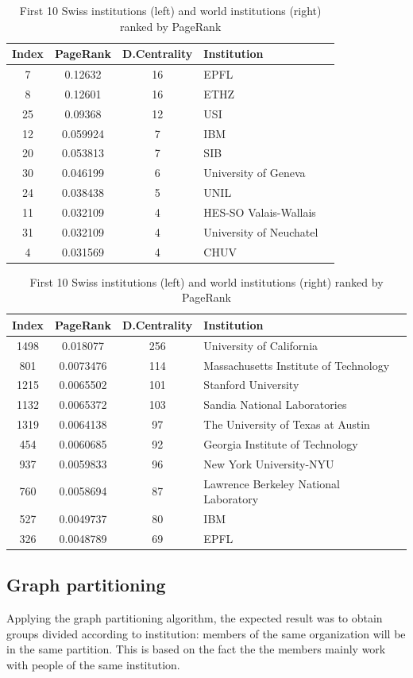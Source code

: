 \documentclass[]{usiinfbachelorproject}
\begin{document}
\newcommand\ddd{\centering}
\begin{table}[tbh]
\centering
\tiny
\caption{First 10 Swiss institutions (left) and world institutions (right)  ranked by PageRank}
\begin{tabular}{c c c l l}
\textbf{Index} & \textbf{PageRank} & \textbf{D.Centrality} & \textbf{Institution}\\
\hline
7 & 0.12632 & 16 & EPFL \\
8 & 0.12601 & 16 & ETHZ \\
25 & 0.09368 & 12 & USI \\
12 & 0.059924 & 7 & IBM \\
20 & 0.053813 & 7 & SIB \\
30 & 0.046199 & 6 & University of Geneva \\
24 & 0.038438 & 5 & UNIL \\
11 & 0.032109 & 4 & HES-SO Valais-Wallais\\
31 & 0.032109 & 4 & University of Neuchatel \\
4 & 0.031569 & 4 & CHUV
\end{tabular}
\qquad\qquad
\begin{tabular}{c c c l l}
\textbf{Index} & \textbf{PageRank} & \textbf{D.Centrality} & \textbf{Institution}\\
\hline
1498 & 0.018077 & 256 & University of California \\
801 & 0.0073476 & 114 & Massachusetts Institute of Technology \\
1215 & 0.0065502 & 101 & Stanford University \\
1132 & 0.0065372 & 103 & Sandia National Laboratories \\
1319 & 0.0064138 & 97 & The University of Texas at Austin \\
454 & 0.0060685 & 92 & Georgia Institute of Technology \\
937 & 0.0059833 & 96 & New York University-NYU \\
760 & 0.0058694 & 87 & Lawrence Berkeley National Laboratory\\
527 & 0.0049737 & 80 & IBM \\
326 & 0.0048789 & 69 & EPFL
\end{tabular}
\label{table:PRUNI}
\end{table}


\subsection{Graph partitioning}
Applying the graph partitioning algorithm, the expected result was to obtain groups divided according to institution: members of the same organization will be in the same partition. This is based on the fact the the members mainly work with people of the same institution. 
\end{document}
